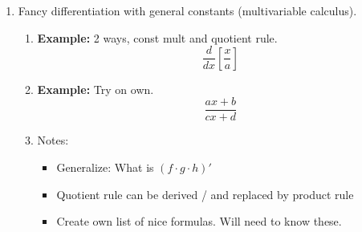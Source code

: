 \documentclass{article}
\begin{document}
\begin{enumerate}
\item Fancy differentiation with general constants (multivariable calculus).
\begin{enumerate}
\item {\bf Example: } 2 ways, const mult and quotient rule.
$$
\frac{d}{dx}[\frac{x}{a}]
$$
\item {\bf Example: } Try on own.
$$
\frac{ax+b}{cx+d}
$$
\item Notes:
\begin{itemize}
\item Generalize: What is $(f\cdot g\cdot h)'$
\item Quotient rule can be derived / and replaced by product rule
\item Create own list of nice formulas. Will need to know these.
\end{itemize}
\end{enumerate} 
\end{enumerate} 


\end{document}
